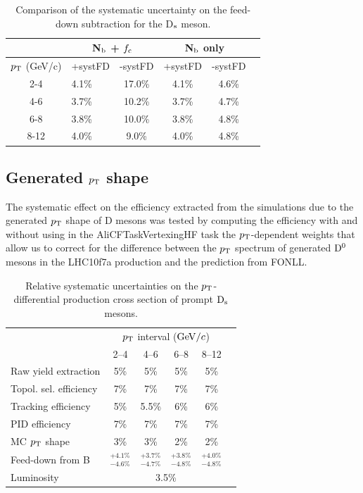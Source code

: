 \begin{table}[tbh!]
\centering
\begin{tabular}{|clc|c|c|c|} 
\hline
& \multicolumn{2}{c|}{N$_{\rm b}$ + $f_{\rm c}$} & \multicolumn{2}{c|}{N$_{\rm b}$ only}\\
\hline
$p_{\rm T}$ (GeV/c) & +systFD & -systFD & +systFD & -systFD \\
\hline
2-4        & 4.1\% & 17.0\% & 4.1\% & 4.6\%\\
4-6        & 3.7\% & 10.2\% & 3.7\% & 4.7\%\\
6-8        & 3.8\% & 10.0\% & 3.8\% & 4.8\%\\
8-12        & 4.0\% & 9.0\% & 4.0\% & 4.8\%\\
\hline
\end{tabular}
\caption{Comparison of the systematic uncertainty on the feed-down subtraction for the D$_{\rm s}$ meson.} 
\label{tab:systFD}
\end{table}

\subsection{Generated $p_{\rm T}$ shape}

The systematic effect on the efficiency extracted from the simulations due to
the generated $p_{\rm T}$ shape of D mesons was tested by computing the efficiency
with and without using in the AliCFTaskVertexingHF task the $p_{\rm T}$-dependent 
weights  that allow us to correct for the difference between the $p_{\rm T}$ 
spectrum of generated ${\rm D^0}$ mesons in the LHC10f7a production and the 
prediction from FONLL.


\begin{table}[!tb]
\centering
\begin{tabular}{l|ccccc|}
 \hline 
  & \multicolumn{4}{c|}{$p_{\rm T}$ interval ($\mathrm{GeV}/c$)}\\
 & 2--4 & 4--6 & 6--8 & 8--12\\
\hline
Raw yield extraction & 5\%& 5\%& 5\%& 5\%\\
Topol. sel. efficiency & 7\%& 7\%& 7\%& 7\%\\
Tracking efficiency & 5\%& 5.5\% & 6\% & 6\%\\
PID efficiency & 7\%& 7\%& 7\%& 7\%\\
MC $p_{\rm T}$ shape   &3\%&3\%&2\%&2\%\\
Feed-down from B & $^{+4.1\%}_{-4.6\%}$& $^{+3.7\%}_{-4.7\%}$& $^{+3.8\%}_{-4.8\%}$& $^{+4.0\%}_{-4.8\%}$\\
Luminosity  
  & \multicolumn{4}{c|}{3.5\%} \\
\hline 
\end{tabular}
\caption{Relative systematic uncertainties on the $p_{\rm T}$-differential production
cross section of prompt ${\rm D_s}$ mesons.}
\label{tab:SystDs}
\end{table}

